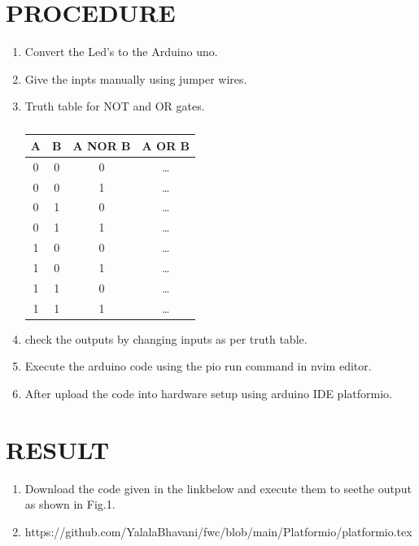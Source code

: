 \documentclass[conference]{IEEEtran}                   \IEEEoverridecommandlockouts
\begin{document}
\section{PROCEDURE}
\begin{enumerate}
	\item Convert the Led's to the Arduino uno.
	\item Give the inpts manually using jumper wires.
	\item Truth table for NOT and OR gates.
		\begin{table}[htbp]
			\centering
		


\begin{tabular}{|c|c|c|c|}
\hline
	A & B & A NOR B & A OR B \\
\hline
0 & 0 & 0 & \ldots \\
0 & 0 & 1 & \ldots \\
0 & 1 & 0 & \ldots \\
0 & 1 & 1 & \ldots \\
1 & 0 & 0 & \ldots \\
1 & 0 & 1 & \ldots \\
1 & 1 & 0 & \ldots \\
1 & 1 & 1 & \ldots \\
\hline
\end{tabular}
		
	\vspace{0.1cm}
	\caption{\label{tab:widgets}}
		\end{table}
	\item check the outputs by changing inputs as per truth table.
	\item Execute the arduino code using the pio run command in nvim editor.
	\item After upload the code into hardware setup using arduino IDE platformio.
\end{enumerate}
\section{RESULT}
\begin{enumerate}
	\item Download the code given in the linkbelow and execute them to seethe output as shown in Fig.1.
	\item https://github.com/YalalaBhavani/fwc/blob/main/Platformio/platformio.tex 
\end{enumerate}
\end{document}

